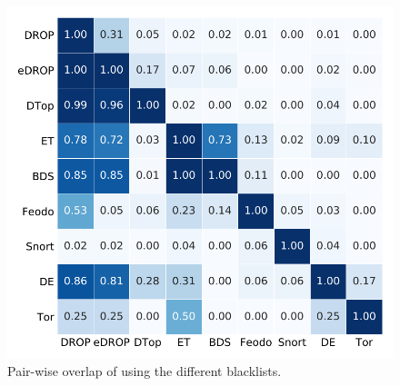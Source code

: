 


\begin{figure}[t]
  \centering
  \includegraphics[width=0.85\linewidth]{data_usage/images/perfect_blocking_heatmap.pdf}
  \caption{Pair-wise overlap of {} using the different blacklists.}
  \label{fig:perfect-heatmap}
\end{figure}

